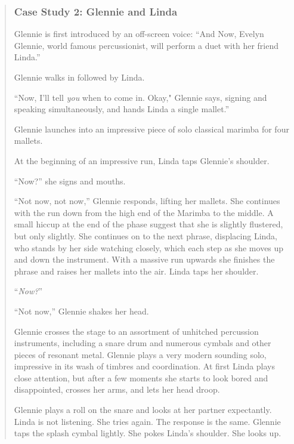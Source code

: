 \documentclass[12pt,letterpaper]{article}
\providecommand{\DIFaddbegin}{} %
\providecommand{\DIFaddend}{} %
\newcommand{\DIFaddincludegraphics}[2][]{{\color{blue}\fbox{\DIFOincludegraphics[#1]{#2}}}} %
\DeclareRobustCommand{\DIFaddbegin}{\DIFOaddbegin \let\includegraphics\DIFaddincludegraphics} %
\DeclareRobustCommand{\DIFaddend}{\DIFOaddend \let\includegraphics\DIFOincludegraphics} %
\begin{document}
	\begin{quote}

	\subsubsection*{Case Study 2: Glennie and Linda}

	\DIFaddbegin \ttfamily

	\DIFaddend Glennie is first introduced by an off-screen voice: ``And Now, Evelyn 
	Glennie, world famous percussionist, will perform a duet with her 
	friend Linda.''

	Glennie walks in followed by Linda.  

	``Now, I'll tell \textit{you} when to come in. Okay," Glennie says, 
	signing and 
	speaking simultaneously, and hands Linda a single mallet.''  

	Glennie launches into an impressive piece of solo classical marimba for 
	four mallets. 

	At the beginning of an impressive run, Linda taps Glennie's shoulder.

	``Now?'' she signs and mouths.

	``Not now, not now,'' Glennie responds, lifting her mallets. She continues
	 with the run down from the high end of the Marimba to the middle. A 
	small hiccup at the end of the phase suggest that she is slightly 
	flustered, but only slightly. She continues on to the next phrase, 
	displacing Linda, who stands by her side watching closely, which each 
	step as she moves up and down the instrument. With a massive run upwards
	she finishes the phrase and raises her mallets into the air. Linda taps 
	her shoulder.

	``\textit{Now?}'' 

	``Not now,'' Glennie shakes her head. 

	Glennie crosses the stage to an assortment of unhitched percussion 
	instruments, including a snare drum and numerous cymbals and other 
	pieces of resonant metal. Glennie plays a very modern sounding solo, 
	impressive in its wash of timbres and coordination. At first Linda 
	plays close attention, but after a few moments she starts to look bored 
	and disappointed, crosses her arms, and lets her head droop.

	Glennie plays a roll on the snare and looks at her partner expectantly. 
	Linda is not listening. She tries again. The response is the same. 
	Glennie taps the splash cymbal lightly. She pokes Linda's shoulder. She 
	looks up.


\end{quote}
\end{document}
